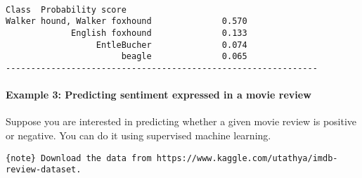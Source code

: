 \documentclass[11pt]{article}
\begin{document}
    \begin{center}
    \end{center}
    { \hspace*{\fill} \\}
    
    \begin{Verbatim}[commandchars=\\\{\}]
                        Class  Probability score
Walker hound, Walker foxhound              0.570
             English foxhound              0.133
                  EntleBucher              0.074
                       beagle              0.065
--------------------------------------------------------------
    \end{Verbatim}

    

    \paragraph{Example 3: Predicting sentiment expressed in a movie
review}\label{example-3-predicting-sentiment-expressed-in-a-movie-review}

Suppose you are interested in predicting whether a given movie review is
positive or negative. You can do it using supervised machine learning.

    \texttt{\{note\}\ Download\ the\ data\ from\ https://www.kaggle.com/utathya/imdb-review-dataset.}
\end{document}

